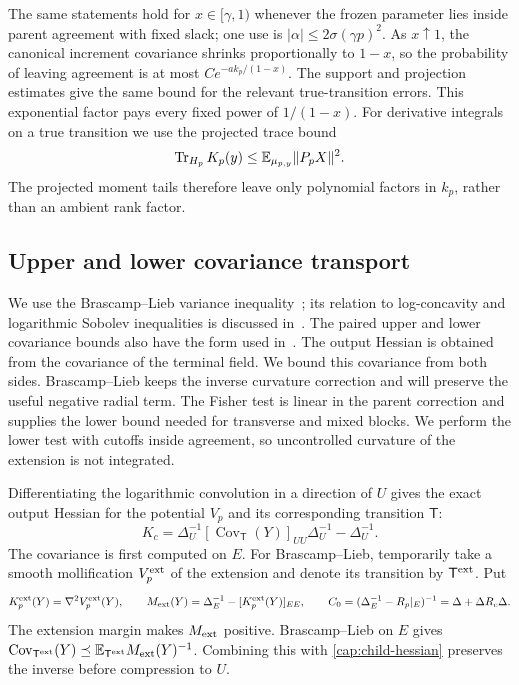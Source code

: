 The same statements hold for \(x\in[\gamma,1)\) whenever the frozen
parameter lies inside parent agreement with fixed slack; one use is
\(|\alpha|\le2\sigma(\gamma p)^2\). As \(x\uparrow1\), the canonical
increment covariance shrinks proportionally to \(1-x\), so the probability
of leaving agreement is at most \(C e^{-a k_p/(1-x)}\). The support and
projection estimates give the same bound for the relevant true-transition
errors. This exponential factor pays every fixed power of \(1/(1-x)\).
For derivative integrals on a true transition we use the projected trace
bound
\[
 \operatorname{Tr}_{H_p}K_p(y)
 \le \mathbb E_{\mu_{p,y}}\|P_pX\|^2.
\]
The projected moment tails therefore leave only polynomial factors in
\(k_p\), rather than an ambient rank factor.

\subsection{Upper and lower covariance transport}
We use the Brascamp--Lieb variance inequality~\cite{BrascampLieb1976};
its relation to log-concavity and logarithmic Sobolev inequalities is
discussed in~\cite{BobkovLedoux2000}. The paired upper and lower covariance
bounds also have the form used in~\cite[Lemma~7 and Appendix~A]{ChewiPooladian2023Entropic}.
The output Hessian is obtained from the covariance of the terminal field.
We bound this covariance from both sides. Brascamp--Lieb keeps the inverse
curvature correction and will preserve the useful negative radial term.
The Fisher test is linear in the parent correction and supplies the lower
bound needed for transverse and mixed blocks. We perform the lower test with
cutoffs inside agreement, so uncontrolled curvature of the extension is not
integrated.

Differentiating the logarithmic convolution in a direction of \(U\) gives
the exact output Hessian for the potential \(V_p\) and its corresponding
transition \(\mathsf T\):
\begin{equation}\label{cap:child-hessian}
 K_c=\Delta_U^{-1}
        [\operatorname{Cov}_{\mathsf T}(Y)]_{UU}
        \Delta_U^{-1}-\Delta_U^{-1}.
\end{equation}
The covariance is first computed on \(E\). For Brascamp--Lieb, temporarily
take a smooth mollification \(V_p^{\rm ext}\) of the extension and denote
its transition by \(\mathsf T^{\rm ext}\). Put
\[
 K_p^{\rm ext}(Y)=\nabla^2 V_p^{\rm ext}(Y),\qquad
 M_{\rm ext}(Y)=\Delta_E^{-1}-[K_p^{\rm ext}(Y)]_{EE},\qquad
 C_0=(\Delta_E^{-1}-R_p|_E)^{-1}
       =\Delta+\Delta R_c\Delta .
\]
The extension margin makes \(M_{\rm ext}\) positive. Brascamp--Lieb on \(E\) gives
\(\operatorname{Cov}_{\mathsf T^{\rm ext}}(Y)
\preceq\mathbb E_{\mathsf T^{\rm ext}}M_{\rm ext}(Y)^{-1}\).
Combining this with \eqref{cap:child-hessian} preserves the inverse before
compression to \(U\).

